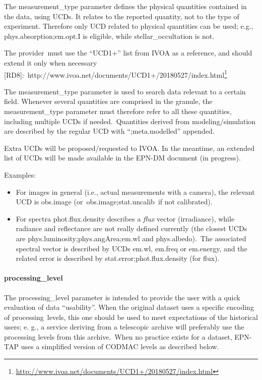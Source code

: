 \documentclass[11pt,a4paper]{ivoa}
\begin{document}
The measurement\_type parameter defines the physical quantities contained in the data, using UCDs. It relates to the reported quantity, not to the type of experiment. Therefore only UCD related to physical quantities can be used; e.g., phys.absorption;em.opt.I is eligible, while stellar\_occultation is not.

The provider must use the ``UCD1+'' list from IVOA as a reference, and should extend it only when necessary [RD8]: http://www.ivoa.net/documents/UCD1+/20180527/index.html\footnote{\url{http://www.ivoa.net/documents/UCD1+/20180527/index.html}}

The measurement\_type parameter is used to search data relevant to a certain field. Whenever several quantities are comprised in the granule, the measurement\_type parameter must therefore refer to all these quantities, including multiple UCDs if needed. Quantities derived from modeling/simulation are described by the regular UCD with ``;meta.modelled'' appended. 

Extra UCDs will be proposed/requested to IVOA. In the meantime, an extended list of UCDs will be made available in the EPN-DM document (in progress).

Examples:

\begin{itemize}
\item For images in general (i.e., actual measurements with a camera), the relevant UCD is obs.image (or obs.image;stat.uncalib if not calibrated).
\item For spectra phot.flux.density describes a \emph{flux} vector (irradiance), while radiance and reflectance are not really defined currently (the closest UCDs are phys.luminosity;phys.angArea;em.wl and phys.albedo). The associated spectral vector is described by UCDs em.wl, em.freq or em.energy, and the related error is described by stat.error;phot.flux.density (for flux).
\end{itemize}

\paragraph{processing\_level}

The processing\_level parameter is intended to provide the user with a quick evaluation of data ``usability''. When the original dataset uses a specific encoding of processing levels, this one should be used to meet expectations of the historical users; e. g., a service deriving from a telescopic archive will preferably use the processing levels from this archive. When no practice exists for a dataset, EPN-TAP uses a simplified version of CODMAC levels as described below.
\end{document}
